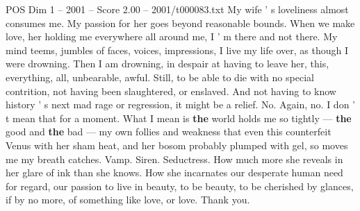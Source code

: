 \begin{textsample}{POS Dim 1 – 2001 – Score 2.00 – 2001/t000083.txt}
My wife ' s loveliness almost consumes me.
My passion for her goes beyond reasonable bounds.
When we make love, her holding me everywhere all around me, I ' m there and not there.
My mind teems, jumbles of faces, voices, impressions, I live my life over, as though I were drowning.
Then I am drowning, in despair at having to leave her, this, everything, all, unbearable, awful.
Still, to be able to die with no special contrition, not having been slaughtered, or enslaved.
And not having to know history ' s next mad rage or regression, it might be a relief.
No.
Again, no.
I don ' t mean that for a moment.
What I mean is \textbf{the} world holds me so tightly — \textbf{the} good and \textbf{the} bad — my own follies and weakness that even this counterfeit Venus with her sham heat, and her bosom probably plumped with gel, so moves me my breath catches.
Vamp.
Siren.
Seductress.
How much more she reveals in her glare of ink than she knows.
How she incarnates our desperate human need for regard, our passion to live in beauty, to be beauty, to be cherished by glances, if by no more, of something like love, or love.
Thank you.

\end{textsample}
